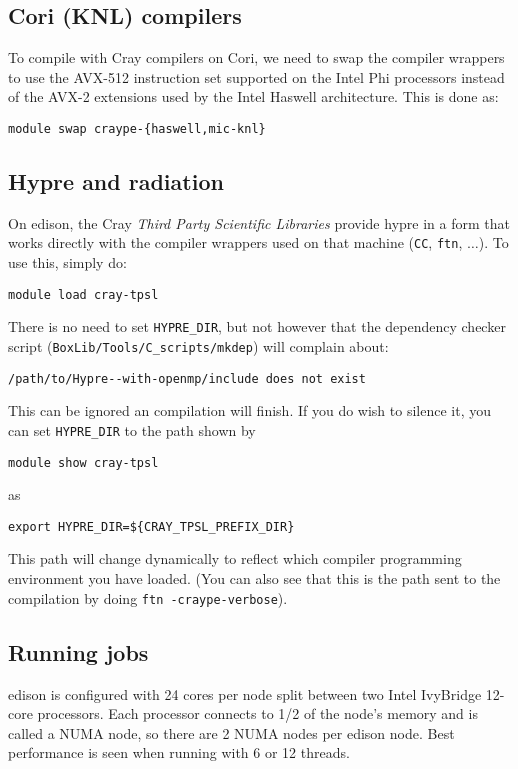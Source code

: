 \subsection{Cori (KNL) compilers}

To compile with Cray compilers on Cori, we need to swap the compiler
wrappers to use the AVX-512 instruction set supported on the Intel Phi
processors instead of the AVX-2 extensions used by the Intel Haswell
architecture.  This is done as:
\begin{verbatim}
module swap craype-{haswell,mic-knl}
\end{verbatim}


\subsection{Hypre and radiation}

On edison, the Cray {\em Third Party Scientific Libraries} provide
{\sf hypre} in a form that works directly with the compiler wrappers
used on that machine ({\tt CC}, {\tt ftn}, $\ldots$).  To use this,
simply do:
\begin{verbatim}
module load cray-tpsl
\end{verbatim}
There is no need to set {\tt HYPRE\_DIR}, but not however that the 
dependency checker script ({\tt BoxLib/Tools/C\_scripts/mkdep}) will
complain about:
\begin{verbatim}
/path/to/Hypre--with-openmp/include does not exist
\end{verbatim}
This can be ignored an compilation will finish.  If you do wish to 
silence it, you can set {\tt HYPRE\_DIR} to the path shown by
\begin{verbatim}
module show cray-tpsl
\end{verbatim}
as
\begin{verbatim}
export HYPRE_DIR=${CRAY_TPSL_PREFIX_DIR}
\end{verbatim}
This path will change dynamically to reflect which compiler programming
environment you have loaded.  (You can also see that this is the path
sent to the compilation by doing {\tt ftn -craype-verbose}).


\subsection{Running jobs}

edison is configured with 24 cores per node split between two Intel             
IvyBridge 12-core processors.  Each processor connects to 1/2 of the            
node's memory and is called a NUMA node, so there are 2 NUMA nodes per          
edison node.  Best performance is seen when running with 6 or 12 threads.  

